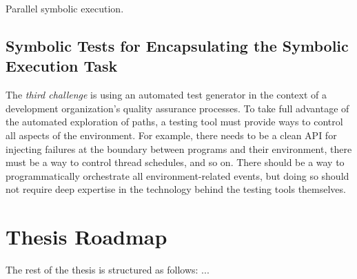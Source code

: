 
Parallel symbolic execution.

\subsection{Symbolic Tests for Encapsulating the Symbolic Execution Task}

The {\em third challenge} is using an automated test generator in the context of a development organization's quality assurance processes.  To take full advantage of the automated exploration of paths, a testing tool must provide ways to control all aspects of the environment.  For example, there needs to be a clean API for injecting failures at the boundary between programs and their environment, there must be a way to control thread schedules, and so on.  There should be a way to programmatically orchestrate all environment-related events, but doing so should not require deep expertise in the technology behind the testing tools themselves.


\section{Thesis Roadmap}

The rest of the thesis is structured as follows: ...
\fi


